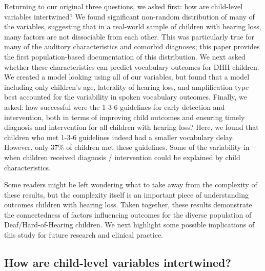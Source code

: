 \documentclass[english,man]{apa6}
\begin{document}
Returning to our original three questions, we asked first: how are child-level variables intertwined? We found significant non-random distribution of many of the variables, suggesting that in a real-world sample of children with hearing loss, many factors are not dissociable from each other. This was particularly true for many of the auditory characteristics and comorbid diagnoses; this paper provides the first population-based documentation of this distribution. We next asked whether these characteristics can predict vocabulary outcomes for DHH children. We created a model looking using all of our variables, but found that a model including only children's age, laterality of hearing loss, and amplification type best accounted for the variability in spoken vocabulary outcomes. Finally, we asked: how successful were the 1-3-6 guidelines for early detection and intervention, both in terms of improving child outcomes and ensuring timely diagnosis and intervention for all children with hearing loss? Here, we found that children who met 1-3-6 guidelines indeed had a smaller vocabulary delay. However, only 37\% of children met these guidelines. Some of the variability in when children received diagnosis / intervention could be explained by child characteristics.

Some readers might be left wondering what to take away from the complexity of these results, but the complexity itself is an important piece of understanding outcomes children with hearing loss. Taken together, these results demonstrate the connectedness of factors influencing outcomes for the diverse population of Deaf/Hard-of-Hearing children. We next highlight some possible implications of this study for future research and clinical practice.

\hypertarget{how-are-child-level-variables-intertwined}{%
\subsection{How are child-level variables intertwined?}\label{how-are-child-level-variables-intertwined}}
\end{document}
